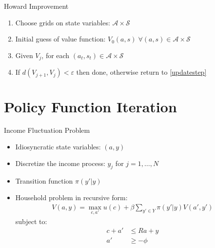 \documentclass{beamer}
\begin{document}
\begin{frame}{Howard Improvement}

  \begin{enumerate}
    \item Choose grids on state variables: $\mathcal{A} \times \mathcal{S}$
    \item Initial guess of value function: $V_0(a, s) \;\forall (a, s) \in \mathcal{A} \times \mathcal{S}$
    \item Given $V_j$, for each $(a_t, s_t) \in \mathcal{A} \times \mathcal{S}$ \label{updatestep}
    \item If $d(V_{j+1}, V_j) < \varepsilon$ then done, otherwise return to \ref{updatestep}
  \end{enumerate}

\end{frame}

\section{Policy Function Iteration}

\begin{frame}{Income Fluctuation Problem}
\begin{itemize}
    \item Idiosyncratic state variables: $(a, y)$
    \item Discretize the income process: $y_j$ for $j = 1, \hdots, N$
    \item Transition function $\pi(y'|y)$
    \item Household problem in recursive form:
    \begin{align*}
    V(a, y) = \max_{c, a'} u(c) + \beta \displaystyle \sum_{y' \in Y} \pi(y'|y) V(a', y') 
    \end{align*}
    subject to:
    \begin{align*}
    c + a' &\leq Ra + y \\
    a' &\geq -\phi
    \end{align*}
\end{itemize}
\end{frame}
\end{document}
